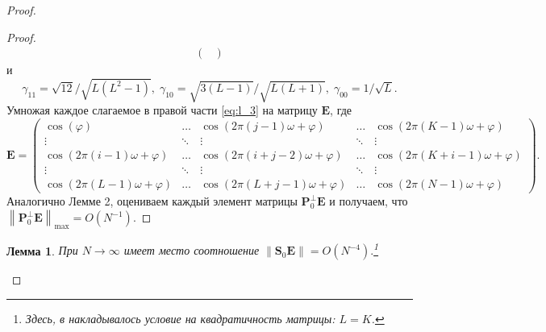 \documentclass[specialist,
substylefile = spbu_report.rtx,
subf,href,colorlinks=true, 12pt]{disser}
\newcommand\norm[1]{\left\|#1\right\|}
\newtheorem{lemma}{Лемма}
\begin{document}
\begin{proof}
\begin{proof}
\begin{align*}
\begin{pmatrix}
				\end{pmatrix}
			\end{align*}
			и
			\begin{equation*}
				\gamma_{11}=\sqrt{12}/\sqrt{L(L^2-1)},\;\gamma_{10}=\sqrt{3(L-1)}/\sqrt{L(L+1)},\;\gamma_{00}=1/\sqrt{L}.
			\end{equation*}
			Умножая каждое слагаемое в правой части \eqref{eq:l_3} на матрицу $\mathbf{E}$, где
			\begin{equation*}
				\mathbf{E}=
				\begin{pmatrix}
					\cos(\varphi)&\dots&\cos(2\pi(j-1)\omega + \varphi)&\dots&\cos(2\pi(K-1)\omega + \varphi)\\
					\vdots&\ddots&\vdots&\ddots&\vdots\\
					\cos(2\pi(i-1)\omega + \varphi)&\dots&\cos(2\pi(i+j-2)\omega + \varphi)&\dots&\cos(2\pi(K+i-1)\omega+\varphi)\\
					\vdots&\ddots&\vdots&\ddots&\vdots\\
					\cos(2\pi(L-1)\omega+\varphi)&\dots&\cos(2\pi(L+j-1)\omega+\varphi)&\dots&\cos(2\pi(N-1)\omega + \varphi)
				\end{pmatrix}
				.
			\end{equation*}
			Аналогично Лемме 2, оцениваем каждый элемент матрицы $\mathbf{P}_0^\bot\mathbf{E}$ и получаем, что \linebreak $\norm{\mathbf{P}_0^\bot\mathbf{E}}_{\max}=O(N^{-1})$.
		\end{proof}
		
		\begin{lemma}
			При $N\rightarrow\infty$ имеет место соотношение $\norm{\mathbf{S}_0\mathbf{E}}=O(N^{-4}).$\footnote{Здесь, в \cite{ZNekrutkin} накладывалось условие на квадратичность матрицы: $L = K$.}
		\end{lemma}
		

\end{proof}
\end{document}
